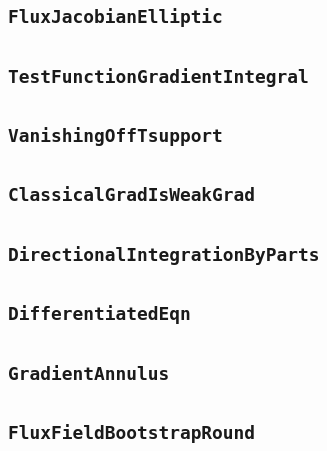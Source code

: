 \documentclass[11pt]{amsart}
\theoremstyle{definition}
\begin{document}
\subsection{\texorpdfstring{\texttt{FluxJacobianElliptic}}{FluxJacobianElliptic}}\label{node:FluxJacobianElliptic}


\subsection{\texorpdfstring{\texttt{TestFunctionGradientIntegral}}{TestFunctionGradientIntegral}}\label{node:TestFunctionGradientIntegral}


\subsection{\texorpdfstring{\texttt{VanishingOffTsupport}}{VanishingOffTsupport}}\label{node:VanishingOffTsupport}


\subsection{\texorpdfstring{\texttt{ClassicalGradIsWeakGrad}}{ClassicalGradIsWeakGrad}}\label{node:ClassicalGradIsWeakGrad}


\subsection{\texorpdfstring{\texttt{DirectionalIntegrationByParts}}{DirectionalIntegrationByParts}}\label{node:DirectionalIntegrationByParts}


\subsection{\texorpdfstring{\texttt{DifferentiatedEqn}}{DifferentiatedEqn}}\label{node:DifferentiatedEqn}


\subsection{\texorpdfstring{\texttt{GradientAnnulus}}{GradientAnnulus}}\label{node:GradientAnnulus}


\subsection{\texorpdfstring{\texttt{FluxFieldBootstrapRound}}{FluxFieldBootstrapRound}}\label{node:FluxFieldBootstrapRound}

\end{document}
